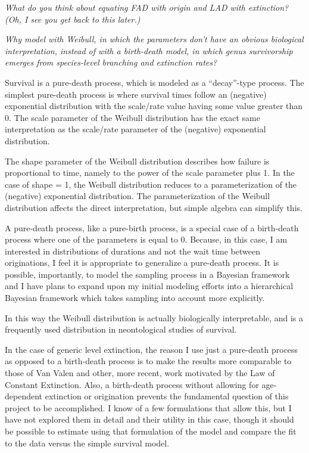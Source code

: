 \documentclass{article}
\begin{document}
\textit{What do you think about equating FAD with origin and LAD with extinction?  (Oh, I see you get back to this later.)}


\textit{Why model with Weibull, in which the parameters don't have an obvious biological interpretation, instead of with a birth-death model, in which genus survivorship emerges from species-level branching and extinction rates?}

Survival is a pure-death process, which is modeled as a ``decay''-type process. The simplest pure-death process is where survival times follow an (negative) exponential distribution with the scale/rate value having some value greater than 0. The scale parameter of the Weibull distribution has the exact same interpretation as the scale/rate parameter of the (negative) exponential distribution. 

The shape parameter of the Weibull distribution describes how failure is proportional to time, namely to the power of the scale parameter plus 1. In the case of shape = 1, the Weibull distribution reduces to a parameterization of the (negative) exponential distribution. The parameterization of the Weibull distribution affects the direct interpretation, but simple algebra can simplify this.

A pure-death process, like a pure-birth process, is a special case of a birth-death process where one of the parameters is equal to 0. Because, in this case, I am interested in distributions of durations and not the wait time between originations, I feel it is appropriate to generalize a pure-death process. It is possible, importantly, to model the sampling process in a Bayesian framework and I have plans to expand upon my initial modeling efforts into a hierarchical Bayesian framework which takes sampling into account more explicitly.

In this way the Weibull distribution is actually biologically interpretable, and is a frequently used distribution in neontological studies of survival.

In the case of generic level extinction, the reason I use just a pure-death process as opposed to a birth-death process is to make the results more comparable to those of Van Valen and other, more recent, work motivated by the Law of Constant Extinction. Also, a birth-death process without allowing for age-dependent extinction or origination prevents the fundamental question of this project to be accomplished. I know of a few formulations that allow this, but I have not explored them in detail and their utility in this case, though it should be possible to estimate using that formulation of the model and compare the fit to the data versus the simple survival model.
\end{document}
